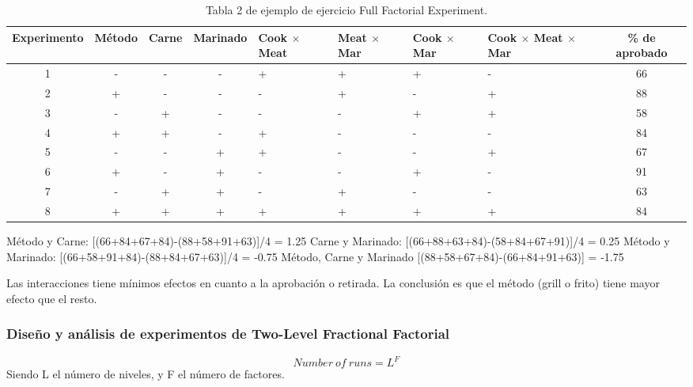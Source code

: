 \documentclass[]{article}
\begin{document}
\begin{table}[H]
	\begin{center}
		\begin{tabular}{|c|c|c|c|p{1.5cm}|p{1.5cm}|p{1.5cm}|p{1.8cm}|c|}
			\hline Experimento & Método & Carne & Marinado & Cook $\times$ Meat & Meat $\times$ Mar & Cook $\times$ Mar & Cook $\times$ Meat $\times$ Mar & \% de aprobado \\ 
			\hline 1 & - & - & - & + & + & + & - & 66 \\ 
			\hline 2 & + & - & - & - & + & - & + & 88 \\ 
			\hline 3 & - & + & - & - & - & + & + & 58 \\ 
			\hline 4 & + & + & - & + & - & - & - & 84 \\ 
			\hline 5 & - & - & + & + & - & - & + & 67 \\ 
			\hline 6 & + & - & + & - & - & + & - & 91 \\ 
			\hline 7 & - & + & + & - & + & - & - & 63 \\ 
			\hline 8 & + & + & + & + & + & + & + & 84 \\ 
			\hline 
		\end{tabular} 
		\caption{Tabla 2 de ejemplo de ejercicio Full Factorial Experiment.}
	\end{center}
\end{table}

Método y Carne: [(66+84+67+84)-(88+58+91+63)]/4 = 1.25 \newline
Carne y Marinado: [(66+88+63+84)-(58+84+67+91)]/4 = 0.25 \newline
Método y Marinado: [(66+58+91+84)-(88+84+67+63)]/4 = -0.75 \newline
Método, Carne y Marinado [(88+58+67+84)-(66+84+91+63)] = -1.75 

Las interacciones tiene mínimos efectos en cuanto a la aprobación o retirada. La conclusión es que el método (grill o frito) tiene mayor efecto que el resto.

\subsubsection{Diseño y análisis de experimentos de Two-Level Fractional Factorial}
\begin{equation}
Number \ of \ runs = L^F
\end{equation}
Siendo L el número de niveles, y F el número de factores.
\end{document}

